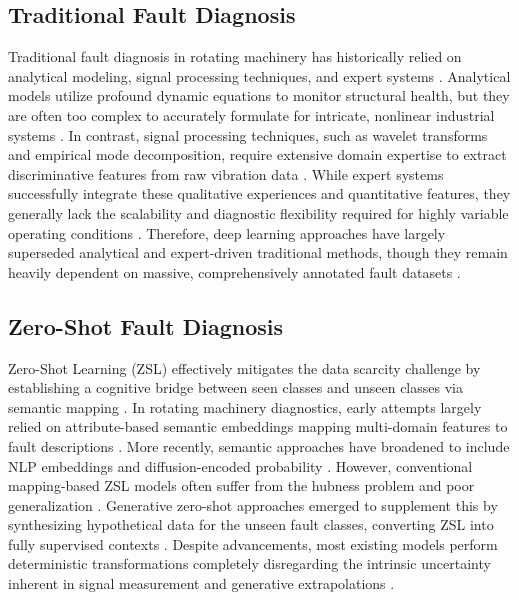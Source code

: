 \documentclass[journal]{IEEEtran}
\begin{document}
\subsection{Traditional Fault Diagnosis}
Traditional fault diagnosis in rotating machinery has historically relied on analytical modeling, signal processing techniques, and expert systems \cite{randall2011rolling,jardine2006review}. Analytical models utilize profound dynamic equations to monitor structural health, but they are often too complex to accurately formulate for intricate, nonlinear industrial systems \cite{jardine2006review}. In contrast, signal processing techniques, such as wavelet transforms and empirical mode decomposition, require extensive domain expertise to extract discriminative features from raw vibration data \cite{yan2014wavelets}. While expert systems successfully integrate these qualitative experiences and quantitative features, they generally lack the scalability and diagnostic flexibility required for highly variable operating conditions \cite{zhao2019deep}. Therefore, deep learning approaches have largely superseded analytical and expert-driven traditional methods, though they remain heavily dependent on massive, comprehensively annotated fault datasets \cite{lei2020applications}.

\subsection{Zero-Shot Fault Diagnosis}
Zero-Shot Learning (ZSL) effectively mitigates the data scarcity challenge by establishing a cognitive bridge between seen classes and unseen classes via semantic mapping \cite{xian2018zero}. In rotating machinery diagnostics, early attempts largely relied on attribute-based semantic embeddings mapping multi-domain features to fault descriptions \cite{zhang2023zero}. More recently, semantic approaches have broadened to include NLP embeddings and diffusion-encoded probability \cite{chen2024semantic}. However, conventional mapping-based ZSL models often suffer from the hubness problem and poor generalization \cite{xian2018zero}. Generative zero-shot approaches emerged to supplement this by synthesizing hypothetical data for the unseen fault classes, converting ZSL into fully supervised contexts \cite{schonfeld2019cada,kingma2013auto}. Despite advancements, most existing models perform deterministic transformations completely disregarding the intrinsic uncertainty inherent in signal measurement and generative extrapolations \cite{gal2016dropout}.
\end{document}
